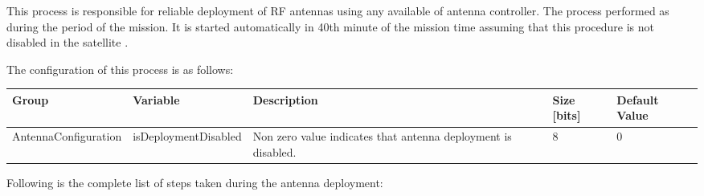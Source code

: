 
This process is responsible for reliable deployment of RF antennas using any available of antenna controller.
The process performed as during the  period of the mission. It is started automatically in 40th 
minute of the mission time assuming that this procedure is not disabled in the satellite .

The configuration of this process is as follows:

\begin{longtable}{l|l|m{6cm}|l|p{1.5cm}}
    \toprule
    \textbf{Group} & \textbf{Variable} & \textbf{Description} & \textbf{Size [bits]} & \textbf{Default Value} \\
    \midrule
    \endhead
    AntennaConfiguration & isDeploymentDisabled          & Non zero value indicates that antenna deployment is disabled. & 8 & 0 \\
    \bottomrule
\end{longtable}


Following is the complete list of steps taken during the antenna deployment:

